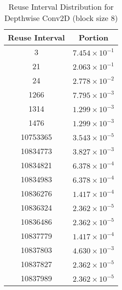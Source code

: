 \documentclass[conference]{article}
\begin{document}
\begin{table}[H]
\centering
\begin{tabular}{|c|c|}
    \hline
    Reuse Interval & Portion \\ 
    \hline
    3 & $7.454 \times 10^{-1}$ \\ 
    21 & $2.063 \times 10^{-1}$ \\ 
    24 & $2.778 \times 10^{-2}$ \\ 
    1266 & $7.795 \times 10^{-3}$ \\ 
    1314 & $1.299 \times 10^{-3}$ \\ 
    1476 & $1.299 \times 10^{-3}$ \\ 
    10753365 & $3.543 \times 10^{-5}$ \\ 
    10834773 & $3.827 \times 10^{-3}$ \\ 
    10834821 & $6.378 \times 10^{-4}$ \\ 
    10834983 & $6.378 \times 10^{-4}$ \\ 
    10836276 & $1.417 \times 10^{-4}$ \\ 
    10836324 & $2.362 \times 10^{-5}$ \\ 
    10836486 & $2.362 \times 10^{-5}$ \\ 
    10837779 & $1.417 \times 10^{-4}$ \\ 
    10837803 & $4.630 \times 10^{-3}$ \\ 
    10837827 & $2.362 \times 10^{-5}$ \\ 
    10837989 & $2.362 \times 10^{-5}$ \\ 
    \hline
\end{tabular}
\caption{Reuse Interval Distribution for Depthwise Conv2D (block size 8)}
\end{table}
\end{document}
